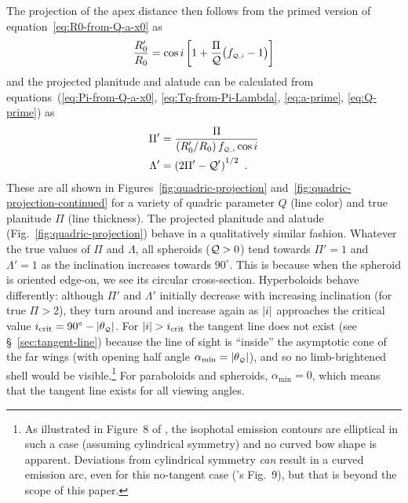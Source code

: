 The projection of the apex distance then follows from the primed
version of equation~\eqref{eq:R0-from-Q-a-x0} as
\begin{equation}
  \label{eq:R0-prime}
  \frac{R_0'}{R_0} =
  \cos i \left[ 1 + \frac{\Pi} {\mathcal{Q}} \bigl(f_{\scriptscriptstyle \mathcal{Q},i} - 1\bigr) \right]
\end{equation}
and the projected planitude and alatude can be calculated from
equations~(\ref{eq:Pi-from-Q-a-x0}, \ref{eq:Tq-from-Pi-Lambda},
\ref{eq:a-prime}, \ref{eq:Q-prime}) as
\begin{align}
  \label{eq:Pi-prime}
  \Pi' &= \frac{\Pi}{(R_0'/R_0)\, f_{\scriptscriptstyle \mathcal{Q},i} \cos i } \\
  \label{eq:Lambda-prime}
  \Lambda' &= \left( 2 \Pi' - \mathcal{Q}' \right)^{1/2} \ .
\end{align}
These are all shown in Figures~\ref{fig:quadric-projection}
and~\ref{fig:quadric-projection-continued} for a variety of quadric
parameter \(Q\) (line color) and true planitude \(\Pi\) (line
thickness).  The projected planitude and alatude
(Fig.~\ref{fig:quadric-projection}) behave in a qualitatively similar
fashion.  Whatever the true values of \(\Pi\) and \(\Lambda\), all spheroids
(\(\mathcal{Q} > 0\)) tend towards \(\Pi' = 1\) and \(\Lambda' = 1\) as the inclination
increases towards \(90^\circ\).  This is because when the spheroid is
oriented edge-on, we see its circular cross-section.  Hyperboloids
behave differently: although \(\Pi'\) and \(\Lambda'\) initially decrease with
increasing inclination (for true \(\Pi > 2\)), they turn around and
increase again as \(\lvert i\rvert\) approaches the critical value
\(i_{\mathrm{crit}} = 90^\circ - \lvert\theta_{\scriptscriptstyle \mathcal{Q}}\rvert\).  For
\(\lvert i\rvert > i_{\mathrm{crit}}\) the tangent line does not exist (see
\S~\ref{sec:tangent-line}) because the line of sight is ``inside'' the
asymptotic cone of the far wings (with opening half angle
\(\alpha_{\mathrm{min}} = \lvert\theta_{\scriptscriptstyle \mathcal{Q}}\rvert\)), and so no limb-brightened shell
would be visible.\footnote{%
  As illustrated in Figure~8 of \citet{Graham:2002a}, the isophotal
  emission contours are elliptical in such a case (assuming
  cylindrical symmetry) and no curved bow shape is apparent.
  Deviations from cylindrical symmetry \emph{can} result in a curved
  emission arc, even for this no-tangent case
  (\citeauthor{Graham:2002a}'s Fig.~9), but that is beyond the scope
  of this paper.} For paraboloids and spheroids,
\(\alpha_{\mathrm{min}} = 0\), which means that the tangent line exists for
all viewing angles.

